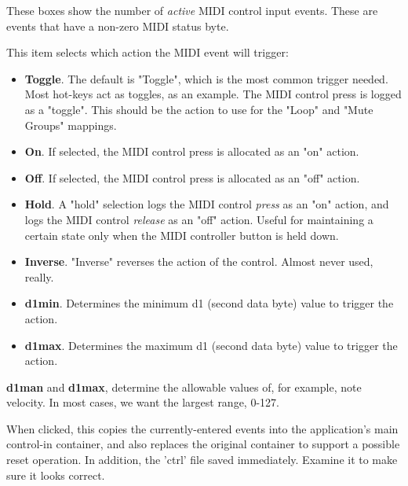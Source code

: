    These boxes show the number of \textsl{active} MIDI control input events.
   These are events that have a non-zero MIDI status byte.

   This item selects which action the MIDI event will trigger:

   \begin{itemize}
      \item \textbf{Toggle}.
         The default is "Toggle", which is the most common trigger needed.
         Most hot-keys act as toggles, as an example.
         The MIDI control press is logged as a "toggle".
         This should be the action to use for the "Loop" and
         "Mute Groups" mappings.
      \item \textbf{On}.
         If selected, the MIDI control press is allocated as an "on" action.
      \item \textbf{Off}.
         If selected, the MIDI control press is allocated as an "off" action.
      \item \textbf{Hold}.
         A "hold" selection logs the MIDI control
         \textsl{press} as an "on"
         action, and logs the MIDI control
         \textsl{release} as an "off" action.
         Useful for maintaining a certain state only when the MIDI
         controller button is held down.
   \end{itemize}


   \begin{itemize}
      \item \textbf{Inverse}.
         "Inverse" reverses the action of the control.
         Almost never used, really.
      \item \textbf{d1min}.
         Determines the minimum d1 (second data byte) value to
         trigger the action.
      \item \textbf{d1max}.
         Determines the maximum d1 (second data byte) value to
         trigger the action.
   \end{itemize}

   \textbf{d1man} and \textbf{d1max}, determine
   the allowable values of, for example, note velocity.
   In most cases, we want the largest range, 0-127.

   When clicked, this copies the currently-entered events into
   the application's main control-in container, and also
   replaces the original container to support a possible
   reset operation.
   In addition, the 'ctrl' file saved immediately.
   Examine it to make sure it looks correct.

